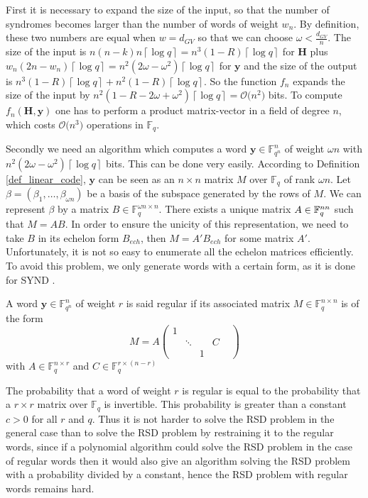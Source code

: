 \documentclass[11pt, a4paper]{llncs}
\newcommand{\Ceil}[1]{\left\lceil #1 \right\rceil}
\newcommand{\Fq}{\mathbb{F}_q}
\newcommand{\Fqn}{\mathbb{F}_{q^n}}
\newcommand{\OO}[1]{\mathcal{O}\big( #1 \big)}
\newcommand{\word}[1]{\ensuremath{\boldsymbol{#1}}}
\newcommand{\yv}{\word{y}}
\newcommand{\Hv}{\word{H}}
\begin{document}
First it is necessary to expand the size of the input, so that the number of syndromes becomes larger than the number of words of weight $w_n$. By definition, these two numbers are equal when $w = d_{GV}$ so that we can  choose $\omega < \frac{d_{GV}}{n}$. The size of the input is $n(n-k)n\Ceil{\log q} = n^3(1-R)\Ceil{\log q}$ for $\Hv$ plus $w_n(2n-w_n)\Ceil{\log q} = n^2(2\omega - \omega^2)\Ceil{\log q}$ for $\yv$ and the size of the output is $n^3(1-R)\Ceil{\log q} + n^2(1-R)\Ceil{\log q}$. So the function $f_n$ expands the size of the input by $n^2(1-R-2\omega + \omega^2)\Ceil{\log q} = \OO{n^2}$ bits. To compute $f_n(\Hv,\yv)$ one has to perform a product matrix-vector in a field of degree $n$, which costs $\OO{n^3}$ operations in $\Fq$.

Secondly we need an algorithm which computes a word $\yv \in \Fqn^n$ of weight $\omega n$ with $n^2(2\omega - \omega^2)\Ceil{\log q}$ bits. This can be done very easily. According to Definition \ref{def_linear_code}, $\yv$ can be seen as an $n\times n$ matrix $M$ over $\Fq$ of rank $\omega n$. Let $\beta = (\beta_1,\dots, \beta_{\omega n})$ be a basis of the subspace generated by the rows of $M$. We can represent $\beta$ by a matrix $B \in \Fq^{\omega n \times n}$. There exists a unique matrix $A \in \Fq^{n\time\omega n}$ such that $M = AB$. In order to ensure the unicity of this representation, we need to take $B$ in its echelon form $B_{ech}$, then $M = A'B_{ech}$ for some matrix $A'$. Unfortunately, it is not so easy to enumerate all the echelon matrices efficiently. To avoid this problem, we only generate words with a certain form, as it is done for SYND \cite{GLS07}.
\begin{definition}
A word $\yv \in \Fqn^n$ of weight $r$ is said regular if its associated matrix $M \in \Fq^{n\times n}$ is of the form
\[ M = A\begin{pmatrix}
1 & & & &\\
& \ddots & &C &\\
& & 1&&
\end{pmatrix} \]
with $A  \in \Fq^{n\times r}$ and $C\in \Fq^{r\times (n-r)}$
\end{definition}

The probability that a word of weight $r$ is regular is equal to the probability that a $r\times r$ matrix over $\Fq$ is invertible. This probability 
is greater than a constant $c > 0$ for all $r$ and $q$. Thus it is not harder to solve the RSD problem in the general case than to solve the RSD problem by restraining it to the regular words, since if a polynomial algorithm could solve the RSD problem
in the case of regular words then it would also give an algorithm solving the
RSD problem with a probability divided by a constant, hence the RSD problem with regular words remains hard.
\end{document}
